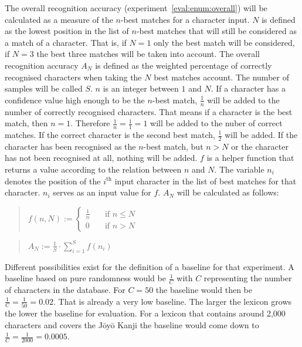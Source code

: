 The overall recognition accuracy (experiment~\ref{eval:enum:overall}) will 
be calculated as a measure of the \(n\)-best matches for a character input. 
\(N\) is defined as the lowest position in the list of \(n\)-best matches 
that will still be considered as a match of a character. 
That is, if \(N = 1\) only the best match will be considered, 
if \(N = 3\) the best three matches will be taken into account.
The overall recognition accuracy \(A_{N}\) is defined as the weighted 
percentage of correctly recognised characters when taking the \(N\) best 
matches account. The number of samples will be called \(S\).
\(n\) is an integer between \(1\) and \(N\). If a character has a 
confidence value high enough to be the \(n\)-best match, \(\frac{1}{n}\) will
be added to the number of correctly recognised characters.
That means if a character is the best match, then \(n = 1\). 
Therefore \(\frac{1}{n} = \frac{1}{1} = 1\) will be added to the nuber of 
correct matches. If the correct character is the second best match, 
\(\frac{1}{2}\) will be added. If the character has been recognised as the 
\(n\)-best match, but \(n > N\) or the character has not been recognised at all,
nothing will be added. \(f\) is a helper function that returns a value
according to the relation between \(n\) and \(N\). The variable
\(n_{i}\) denotes the position of the \(i^{\text{th}}\) input character in
the list of best matches for that character. \(n_{i}\) serves as an input
value for \(f\). \(A_N\) will be calculated as follows:
\begin{quote}
  \(
    f(n, N):=
    \begin{cases}
      \frac{1}{n} & \quad \text{if $n \leq N$} \\
      0 & \quad \text{if $n > N$}
    \end{cases}
  \)
\end{quote}
\begin{quote}
  \(
    A_N := \frac{1}{S} \cdot \sum\limits_{i=1}^{S}{f(n_{i})}
  \)
\end{quote}
Different possibilities exist for the definition of a baseline for that 
experiment. A baseline based on pure randomness would be \(\frac{1}{C}\) with
\(C\) representing the number of characters in the database. For \(C = 50\) 
the baseline would then be \(\frac{1}{C} = \frac{1}{50} = 0.02\).
That is already a very low baseline. The larger the lexicon grows the
lower the baseline for evaluation. For a lexicon that contains around 2,000 
characters and covers the Jōyō Kanji the baseline would come down to
\(\frac{1}{C} = \frac{1}{2000} = 0.0005\).
